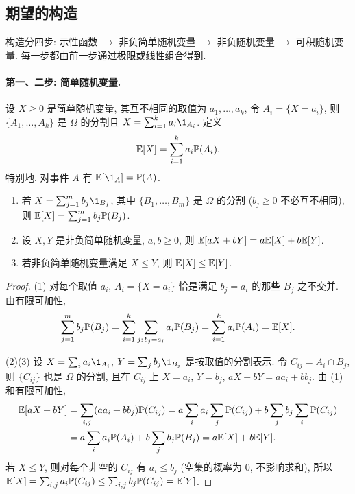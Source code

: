 \subsection{期望的构造}

构造分四步: 示性函数 $\to$ 非负简单随机变量 $\to$ 非负随机变量 $\to$ 可积随机变量. 每一步都由前一步通过极限或线性组合得到.

\paragraph{第一、二步: 简单随机变量.}
设 $X\ge0$ 是简单随机变量, 其互不相同的取值为 $a_1,\dots,a_k$, 令 $A_i=\{X=a_i\}$, 则 $\{A_1,\dots,A_k\}$ 是 $\Omega$ 的分割且 $X=\sum_{i=1}^k a_i\1_{A_i}$. 定义
\begin{equation}\label{eq:simple-expectation}
\mathbb{E}[X]=\sum_{i=1}^k a_i\mathbb{P}(A_i).
\end{equation}
特别地, 对事件 $A$ 有 $\E[\1_A]=\P(A)$.

\begin{lemma}\label{lem:simple-properties}
\begin{enumerate}
\item 若 $X=\sum_{j=1}^m b_j\1_{B_j}$, 其中 $\{B_1,\dots,B_m\}$ 是 $\Omega$ 的分割 ($b_j\ge0$ 不必互不相同), 则 $\mathbb{E}[X]=\sum_{j=1}^m b_j\mathbb{P}(B_j)$.
\item 设 $X,Y$ 是非负简单随机变量, $a,b\ge0$, 则 $\mathbb{E}[aX+bY]=a\mathbb{E}[X]+b\mathbb{E}[Y]$.
\item 若非负简单随机变量满足 $X\le Y$, 则 $\mathbb{E}[X]\le\mathbb{E}[Y]$.
\end{enumerate}
\end{lemma}

\begin{proof}
(1) 对每个取值 $a_i$, $A_i=\{X=a_i\}$ 恰是满足 $b_j=a_i$ 的那些 $B_j$ 之不交并. 由有限可加性,
\[
\sum_{j=1}^m b_j\mathbb{P}(B_j)=\sum_{i=1}^k\sum_{j:\,b_j=a_i}a_i\mathbb{P}(B_j)=\sum_{i=1}^k a_i\mathbb{P}(A_i)=\mathbb{E}[X].
\]

(2)(3) 设 $X=\sum_i a_i\1_{A_i}$, $Y=\sum_j b_j\1_{B_j}$ 是按取值的分割表示. 令 $C_{ij}=A_i\cap B_j$, 则 $\{C_{ij}\}$ 也是 $\Omega$ 的分割, 且在 $C_{ij}$ 上 $X=a_i$, $Y=b_j$, $aX+bY=aa_i+bb_j$. 由 (1) 和有限可加性,
\begin{align*}
\mathbb{E}[aX+bY]&=\sum_{i,j}(aa_i+bb_j)\mathbb{P}(C_{ij})=a\sum_i a_i\sum_j\mathbb{P}(C_{ij})+b\sum_j b_j\sum_i\mathbb{P}(C_{ij})\\
&=a\sum_i a_i\mathbb{P}(A_i)+b\sum_j b_j\mathbb{P}(B_j)=a\mathbb{E}[X]+b\mathbb{E}[Y].
\end{align*}
若 $X\le Y$, 则对每个非空的 $C_{ij}$ 有 $a_i\le b_j$ (空集的概率为 $0$, 不影响求和), 所以 $\mathbb{E}[X]=\sum_{i,j}a_i\mathbb{P}(C_{ij})\le\sum_{i,j}b_j\mathbb{P}(C_{ij})=\mathbb{E}[Y]$.
\end{proof}

